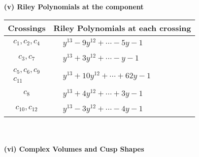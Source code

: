 \documentclass[1p]{elsarticle_modified}
\theoremstyle{definition}
\begin{document}
\newpage\renewcommand{\arraystretch}{1}
\flushleft \textbf{(v) Riley Polynomials at the component}\newline \\
\begin{tabular}{m{50pt}|m{274pt}}
Crossings & \hspace{64pt}Riley Polynomials at each crossing \\
\hline $$\begin{aligned}c_{1},c_{2},c_{4}\end{aligned}$$&$\begin{aligned}
&y^{13}-9 y^{12}+\cdots-5 y-1
\end{aligned}$\\
\hline $$\begin{aligned}c_{3},c_{7}\end{aligned}$$&$\begin{aligned}
&y^{13}+3 y^{12}+\cdots- y-1
\end{aligned}$\\
\hline $$\begin{aligned}c_{5},c_{6},c_{9}\\c_{11}\end{aligned}$$&$\begin{aligned}
&y^{13}+10 y^{12}+\cdots+62 y-1
\end{aligned}$\\
\hline $$\begin{aligned}c_{8}\end{aligned}$$&$\begin{aligned}
&y^{13}+4 y^{12}+\cdots+3 y-1
\end{aligned}$\\
\hline $$\begin{aligned}c_{10},c_{12}\end{aligned}$$&$\begin{aligned}
&y^{13}-3 y^{12}+\cdots-4 y-1
\end{aligned}$\\
\hline
\end{tabular}\\~\\
\newpage\flushleft \textbf{(vi) Complex Volumes and Cusp Shapes}
\end{document}
